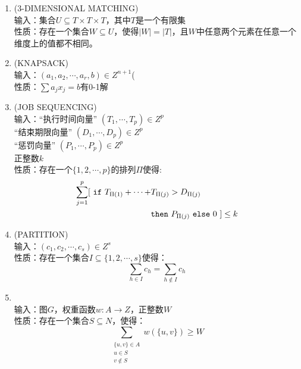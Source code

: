 \documentclass[twocolumn]{article}
\theoremstyle{nonumberplain}%
\begin{document}
\begin{CJK}{UTF8}{gbsn}
\begin{enumerate}
    \item {(3-DIMENSIONAL MATCHING)}\\
    输入：集合$U\subseteq T\times T\times T$，其中$T$是一个有限集\\
    性质：存在一个集合$W\subseteq U$，使得$|W|=|T|$，且$W$中任意两个元素在任意一个维度上的值都不相同。

    \item {(KNAPSACK)}\\
    输入：$(a_1,a_2,\cdots,a_r,b)\in Z^{n+1}$(\\
    性质：$\sum a_j x_j=b$有0-1解

    \item {(JOB SEQUENCING)}\\
    输入：“执行时间向量” $(T_1,\cdots,T_p)\in Z^p$\\
    \hphantom{输入：}“结束期限向量” $(D_1,\cdots,D_p)\in Z^p$\\
    \hphantom{输入：}“惩罚向量” $(P_1,\cdots,P_p)\in Z^p$\\
    \hphantom{输入：}正整数$k$\\
    性质：存在一个$\{1,2,\cdots,p\}$的排列$\Pi$使得:
    \begin{equation}\nonumber
        \begin{aligned}
            \sum_{j=1}^{p} [ \ {\tt if}\  T_{\Pi(1)}+\cdots+&T_{\Pi(j)} > D_{\Pi(j)} \\
                            & {\tt then} \  P_{\Pi(j)}\ {\tt else}\  0 \  ] \leq k
        \end{aligned}
    \end{equation}

    \item {(PARTITION)}\\
    输入：$(c_1,c_2,\cdots,c_s)\in Z^s$\\
    性质：存在一个集合$I\subseteq\{1,2,\cdots,s\}$使得：
    $$\sum_{h\in I}c_h = \sum_{h\notin I}c_h$$

    \item {}\\
    输入：图$G$，权重函数$w:A\rightarrow Z$，正整数$W$\\
    性质：存在一个集合$S\subseteq N$，使得：
    $$\sum_{\substack{\{u,v\}\in A \\ u\in S \\ v\notin S}} w(\{u,v\})\ge W$$

    \end{enumerate}


\end{CJK}
\end{document}
